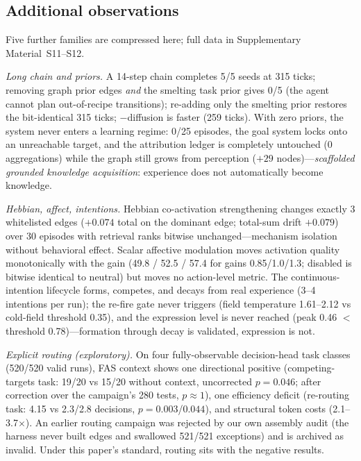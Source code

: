 \documentclass[10pt,a4paper]{article}
\begin{document}
\subsection{Additional observations}
\label{sec:res-system}
Five further families are compressed here; full data in Supplementary Material~S11--S12.

\emph{Long chain and priors.} A 14-step chain completes 5/5 seeds at 315 ticks; removing graph prior edges \emph{and} the smelting task prior gives 0/5 (the agent cannot plan out-of-recipe transitions); re-adding only the smelting prior restores the bit-identical 315 ticks; $-$diffusion is faster (259 ticks). With zero priors, the system never enters a learning regime: 0/25 episodes, the goal system locks onto an unreachable target, and the attribution ledger is completely untouched (0 aggregations) while the graph still grows from perception ($+29$ nodes)---\emph{scaffolded grounded knowledge acquisition}: experience does not automatically become knowledge.

\emph{Hebbian, affect, intentions.} Hebbian co-activation strengthening changes exactly 3 whitelisted edges ($+0.074$ total on the dominant edge; total-sum drift $+0.079$) over 30 episodes with retrieval ranks bitwise unchanged---mechanism isolation without behavioral effect. Scalar affective modulation moves activation quality monotonically with the gain (49.8 / 52.5 / 57.4 for gains 0.85/1.0/1.3; disabled is bitwise identical to neutral) but moves no action-level metric. The continuous-intention lifecycle forms, competes, and decays from real experience (3--4 intentions per run); the re-fire gate never triggers (field temperature 1.61--2.12 vs cold-field threshold 0.35), and the expression level is never reached (peak 0.46 $<$ threshold 0.78)---formation through decay is validated, expression is not.

\emph{Explicit routing (exploratory).} On four fully-observable decision-head task classes (520/520 valid runs), FAS context shows one directional positive (competing-targets task: 19/20 vs 15/20 without context, uncorrected $p{=}0.046$; after correction over the campaign's 280 tests, $p{\approx}1$), one efficiency deficit (re-routing task: 4.15 vs 2.3/2.8 decisions, $p{=}0.003$/$0.044$), and structural token costs (2.1--3.7$\times$). An earlier routing campaign was rejected by our own assembly audit (the harness never built edges and swallowed 521/521 exceptions) and is archived as invalid. Under this paper's standard, routing sits with the negative results.
\end{document}
